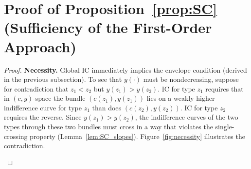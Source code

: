 \documentclass[12pt,a4paper]{article}
\theoremstyle{definition}
\theoremstyle{plain}
\theoremstyle{remark}
\begin{document}
\newpage
\appendix

\section{Proof of Proposition~\ref{prop:SC} (Sufficiency of the First-Order Approach)}
\label{app:SC_proof}

\begin{proof}
\textbf{Necessity.} Global IC immediately implies the envelope condition (derived in the previous subsection). To see that $y(\cdot)$ must be nondecreasing, suppose for contradiction that $z_1 < z_2$ but $y(z_1) > y(z_2)$. IC for type $z_1$ requires that in $(c,y)$-space the bundle $(c(z_1), y(z_1))$ lies on a weakly higher indifference curve for type $z_1$ than does $(c(z_2), y(z_2))$. IC for type $z_2$ requires the reverse. Since $y(z_1) > y(z_2)$, the indifference curves of the two types through these two bundles must cross in a way that violates the single-crossing property (Lemma~\ref{lem:SC_slopes}). Figure~\ref{fig:necessity} illustrates the contradiction.

\begin{figure}[ht]
\centering
{}
\end{figure}
\end{proof}
\end{document}
